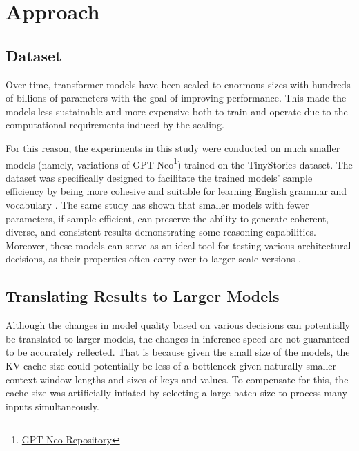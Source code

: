 \section{Approach}


\subsection{Dataset}
Over time, transformer models have been scaled to enormous sizes with hundreds of billions of parameters with the goal of improving performance. This made the models less sustainable and more expensive both to train and operate due to the computational requirements induced by the scaling. 

For this reason, the experiments in this study were conducted on much smaller models (namely, variations of GPT-Neo\footnote{\href{https://github.com/EleutherAI/gpt-neo}{GPT-Neo Repository}}) trained on the TinyStories dataset. The dataset was specifically designed to facilitate the trained models' sample efficiency by being more cohesive and suitable for learning English grammar and vocabulary \cite{eldan_tinystories_2023}. The same study has shown that smaller models with fewer parameters, if sample-efficient, can preserve the ability to generate coherent, diverse, and consistent results demonstrating some reasoning capabilities. Moreover, these models can serve as an ideal tool for testing various architectural decisions, as their properties often carry over to larger-scale versions \cite{eldan_tinystories_2023}. 

\subsection{Translating Results to Larger Models}
Although the changes in model quality based on various decisions can potentially be translated to larger models, the changes in inference speed are not guaranteed to be accurately reflected. That is because given the small size of the models, the KV cache size could potentially be less of a bottleneck given naturally smaller context window lengths and sizes of keys and values. To compensate for this, the cache size was artificially inflated by selecting a large batch size to process many inputs simultaneously. 

